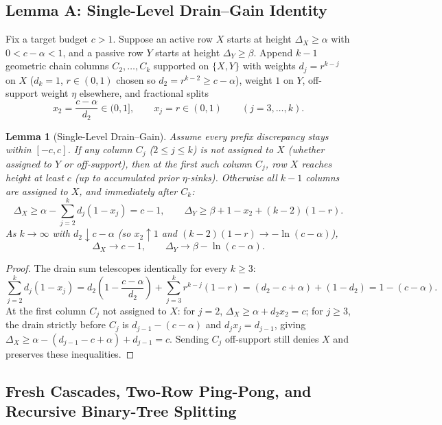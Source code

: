 \documentclass[11pt]{article}
\newtheorem{lemma}[theorem]{Lemma}
\theoremstyle{definition}
\newcommand{\disc}{\Delta}
\begin{document}
\subsection{Lemma A: Single-Level Drain--Gain Identity}

Fix a target budget $c>1$. Suppose an active row $X$ starts at height $\disc_X\ge\alpha$ with $0<c-\alpha<1$, and a passive row $Y$ starts at height $\disc_Y\ge\beta$. Append $k-1$ geometric chain columns $C_2,\dots,C_k$ supported on $\{X,Y\}$ with weights $d_j=r^{k-j}$ on $X$ ($d_k=1$, $r\in(0,1)$ chosen so $d_2=r^{k-2}\ge c-\alpha$), weight $1$ on $Y$, off-support weight $\eta$ elsewhere, and fractional splits
\[
 x_2=\frac{c-\alpha}{d_2}\in(0,1],\qquad x_j=r\in(0,1)\qquad (j=3,\dots,k).
\]

\begin{lemma}[Single-Level Drain--Gain]\label{lem:draingain}
Assume every prefix discrepancy stays within $[-c,c]$. If any column $C_j$ ($2\le j\le k$) is not assigned to $X$ (whether assigned to $Y$ or off-support), then at the first such column $C_j$, row $X$ reaches height at least $c$ (up to accumulated prior $\eta$-sinks). Otherwise all $k-1$ columns are assigned to $X$, and immediately after $C_k$:
\[
 \disc_X\ge \alpha-\sum_{j=2}^k d_j(1-x_j) = c-1,\qquad
 \disc_Y\ge \beta + 1 - x_2 + (k-2)(1-r).
\]
As $k\to\infty$ with $d_2\downarrow c-\alpha$ (so $x_2\uparrow 1$ and $(k-2)(1-r)\to-\ln(c-\alpha)$),
\[
 \disc_X \longrightarrow c-1,\qquad \disc_Y \longrightarrow \beta - \ln(c-\alpha).
\]
\end{lemma}
\begin{proof}
The drain sum telescopes identically for every $k\ge 3$:
\[
 \sum_{j=2}^k d_j(1-x_j)
 = d_2\left(1-\frac{c-\alpha}{d_2}\right)+\sum_{j=3}^k r^{k-j}(1-r)
 = (d_2 - c + \alpha) + (1 - d_2)
 = 1 - (c-\alpha).
\]
At the first column $C_j$ not assigned to $X$: for $j=2$, $\disc_X\ge\alpha+d_2 x_2=c$; for $j\ge 3$, the drain strictly before $C_j$ is $d_{j-1}-(c-\alpha)$ and $d_j x_j=d_{j-1}$, giving $\disc_X\ge\alpha-(d_{j-1}-c+\alpha)+d_{j-1}=c$. Sending $C_j$ off-support still denies $X$ and preserves these inequalities.
\end{proof}

\subsection{Fresh Cascades, Two-Row Ping-Pong, and Recursive Binary-Tree Splitting}
\end{document}
